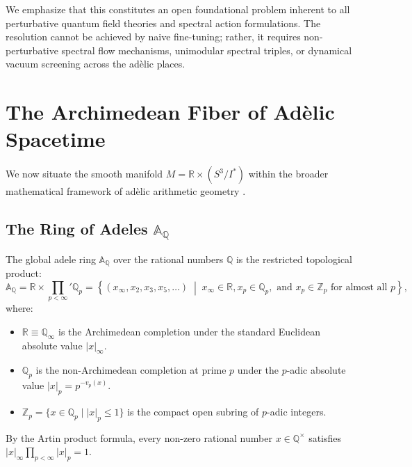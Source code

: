 \documentclass[11pt,a4paper]{article}
\theoremstyle{definition}
\begin{document}
We emphasize that this constitutes an open foundational problem inherent to all perturbative quantum field theories and spectral action formulations. The resolution cannot be achieved by naive fine-tuning; rather, it requires non-perturbative spectral flow mechanisms, unimodular spectral triples, or dynamical vacuum screening across the ad\`elic places.

\section{The Archimedean Fiber of Ad\`elic Spacetime}

We now situate the smooth manifold $M = \mathbb{R} \times (S^3 / I^*)$ within the broader mathematical framework of ad\`elic arithmetic geometry \cite{Tate1950,Gelfand1969}.

\subsection{The Ring of Adeles $\mathbb{A}_{\mathbb{Q}}$}
The global adele ring $\mathbb{A}_{\mathbb{Q}}$ over the rational numbers $\mathbb{Q}$ is the restricted topological product:
\begin{equation}
\mathbb{A}_{\mathbb{Q}} = \mathbb{R} \times {\prod_{p < \infty}}' \mathbb{Q}_p = \left\{ (x_\infty, x_2, x_3, x_5, \dots) \;\middle|\; x_\infty \in \mathbb{R}, x_p \in \mathbb{Q}_p, \text{ and } x_p \in \mathbb{Z}_p \text{ for almost all } p \right\},
\end{equation}
where:
\begin{itemize}
\item $\mathbb{R} \equiv \mathbb{Q}_\infty$ is the Archimedean completion under the standard Euclidean absolute value $|x|_\infty$.
\item $\mathbb{Q}_p$ is the non-Archimedean completion at prime $p$ under the $p$-adic absolute value $|x|_p = p^{-v_p(x)}$.
\item $\mathbb{Z}_p = \{x \in \mathbb{Q}_p \mid |x|_p \le 1\}$ is the compact open subring of $p$-adic integers.
\end{itemize}
By the Artin product formula, every non-zero rational number $x \in \mathbb{Q}^\times$ satisfies $|x|_\infty \prod_{p < \infty} |x|_p = 1$.
\end{document}
